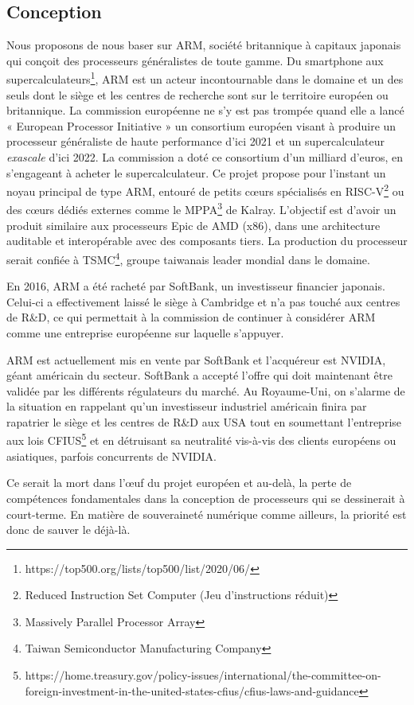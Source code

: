 \documentclass[a4paper]{article}
\begin{document}
\subsection{Conception}
Nous proposons de nous baser sur ARM, société britannique à capitaux japonais qui conçoit des processeurs généralistes de toute gamme. Du smartphone aux supercalculateurs\footnote{https://top500.org/lists/top500/list/2020/06/}, ARM est un acteur incontournable dans le domaine et un des seuls dont le siège et les centres de recherche sont sur le territoire européen ou britannique. 
La commission européenne ne s’y est pas trompée quand elle a lancé « European Processor Initiative » un consortium européen visant à produire un processeur généraliste de haute performance d’ici 2021 et un supercalculateur \textit{exascale} d’ici 2022. La commission a doté ce consortium d’un milliard d’euros, en s’engageant à acheter le supercalculateur. Ce projet propose pour l’instant un noyau principal de type ARM, entouré de petits cœurs spécialisés en RISC-V\footnote{Reduced Instruction Set Computer (Jeu d’instructions réduit)} ou des cœurs dédiés externes comme le MPPA\footnote{Massively Parallel Processor Array} de Kalray. L’objectif est d’avoir un produit similaire aux processeurs Epic de AMD (x86), dans une architecture auditable et interopérable avec des composants tiers. La production du processeur serait confiée à TSMC\footnote{Taiwan Semiconductor Manufacturing Company}, groupe taiwanais leader mondial dans le domaine. 

En 2016, ARM a été racheté par SoftBank, un investisseur financier japonais. Celui-ci a effectivement laissé le siège à Cambridge et n’a pas touché aux centres de R\&D, ce qui permettait à la commission de continuer à considérer ARM comme une entreprise européenne sur laquelle s’appuyer. 

ARM est actuellement mis en vente par SoftBank et l’acquéreur est NVIDIA, géant américain du secteur. SoftBank a accepté l’offre qui doit maintenant être validée par les différents régulateurs du marché. Au Royaume-Uni, on s’alarme de la situation en rappelant qu’un investisseur industriel américain finira par rapatrier le siège et les centres de R\&D aux USA tout en soumettant l’entreprise aux lois CFIUS\footnote{https://home.treasury.gov/policy-issues/international/the-committee-on-foreign-investment-in-the-united-states-cfius/cfius-laws-and-guidance} et en détruisant sa neutralité vis-à-vis des clients européens ou asiatiques, parfois concurrents de NVIDIA. 

Ce serait la mort dans l’œuf du projet européen et au-delà, la perte de compétences fondamentales dans la conception de processeurs qui se dessinerait à court-terme. En matière de souveraineté numérique comme ailleurs, la priorité est donc de sauver le déjà-là.
\end{document}
